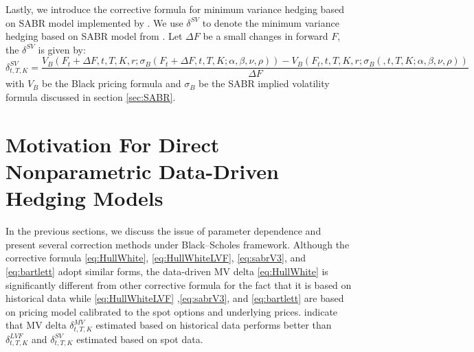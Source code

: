 \documentclass[letterpaper,12pt,titlepage,oneside,final]{book}
\numberwithin{equation}{section}
\theoremstyle{definition}
\begin{document}
Lastly, we introduce the corrective formula for minimum variance hedging  based on  SABR model implemented by  \citet{hulloptimal} . We use $\delta^{SV}$ to denote the minimum variance hedging  based on  SABR model from \cite{hulloptimal}. Let $\Delta F$ be a small changes in forward $F$, the  $\delta^{SV}$ is given by:
\begin{equation}
	\delta^{SV}_{t,T,K}=\frac{V_B(F_t+\Delta F,t,T,K,r;\sigma_B (F_t+\Delta F,t,T,K;\alpha,\beta,\nu,\rho))-V_B(F_t,t,T,K,r;\sigma_B (,t,T,K;\alpha,\beta,\nu,\rho))}{\Delta F}
	\label{eq:HullWhiteSabr}
\end{equation}
with $V_B$ be the Black pricing formula and $\sigma_B$ be the SABR implied volatility formula discussed in section \ref{sec:SABR}. 



\section{Motivation For Direct Nonparametric Data-Driven Hedging Models}
In the previous sections, we discuss the issue of parameter dependence and present several correction methods under Black–Scholes framework. Although the corrective formula   \eqref{eq:HullWhite}, \eqref{eq:HullWhiteLVF}, \eqref{eq:sabrV3}, and \eqref{eq:bartlett} adopt similar forms, the data-driven MV delta \eqref{eq:HullWhite} is significantly different from other corrective formula for the fact that it is based on historical data while \eqref{eq:HullWhiteLVF} ,\eqref{eq:sabrV3}, and \eqref{eq:bartlett} are based on pricing model calibrated to the spot options and underlying prices. \citet{hulloptimal} indicate that MV delta $\delta^{MV}_{t,T,K}$ estimated based on historical data performs better than $\delta^{LVF}_{t,T,K}$ and $\delta^{SV}_{t,T,K}$ estimated based on spot data. 
\end{document}
